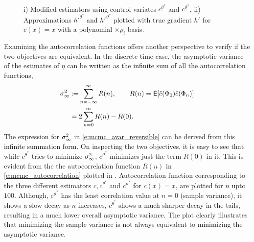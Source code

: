 \begin{figure}[htbp]
	\centering
	\mbox{
		 \quad
	}
	\caption{i) Modified estimators using control variates $c^{\theta^*}$ and $c^{\vartheta^*}$, ii) Approximations $h'^{\theta^*}$ and $h'^{\vartheta^*}$ plotted with true gradient $h'$ for $c(x) =x$ with a polynomial $\times \rho_i$ basis.}
	\label{fig:mcmc_cv_theta_var}
\end{figure}


Examining the autocorrelation functions offers another perspective to verify if the two objectives are equivalent. In the discrete time case, the asymptotic variance of the estimates of $\eta$ can be written as the infinite sum of all the autocorrelation functions,
\begin{equation}
\begin{aligned}
\asymvar  & \eqdef \sum_{n=-\infty}^\infty R(n), \qquad R(n) = \Expect [\tilc(\markovstate_0) \tilc(\markovstate_n)] \\
& = 2 \sum_{n=0}^\infty R(n)- R(0).
\end{aligned}
\label{e:mcmc_autocorrelation}
\end{equation}
The expression for $\sigma^2_\infty$ in \eqref{e:mcmc_avar_reversible} can be derived from this infinite summation form. On inspecting the two objectives, it is easy to see that while $c^{\theta^*}$ tries to minimize $\sigma^2_\infty$, $c^{\vartheta^*}$ minimizes just the term $R(0)$ in it. This is evident from the the autocorrelation function $R(n)$ in \eqref{e:mcmc_autocorrelation} plotted in . Autocorrelation function corresponding to the three different estimators $c,c^{\theta^*}$  and $c^{\vartheta^*}$ for $c(x) = x$, are plotted for $n$ upto $100$. Although, $c^{\vartheta^{*}}$ has the least correlation value at $n=0$ (sample variance), it shows a slow decay as $n$ increases, $c^{\theta^*}$ shows a much sharper decay in the tails, resulting in a much lower overall asymptotic variance. The plot clearly illustrates that minimizing the sample variance is not always equivalent to minimizing the asymptotic variance.

